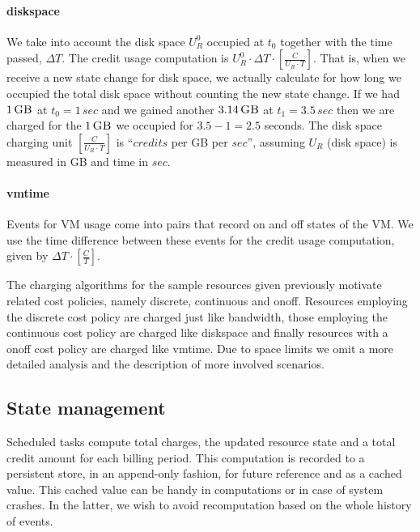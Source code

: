 \documentclass[letterpaper,twocolumn,10pt]{article}
\newcommand{\GB}[1]{\ensuremath{#1\,\mbox{\sc GB}}}
\newcommand{\secs}[1]{\ensuremath{#1\,sec}}
\begin{document}
\paragraph{\textsf{diskspace}}
We take into account the disk space $U_R^0$ occupied at $t_0$ together with the time passed, $\Delta T$. The credit usage computation is $U_R^{0} \cdot \Delta T \cdot [ \frac{C}{U_R \cdot T} ]$.
That is, when we receive a new state change for disk space, we actually calculate for how long we occupied the total disk space without counting the new state change. If we had \GB{1} at $t_0 = \secs{1}$ and we gained another \GB{3.14} at $t_1 = \secs{3.5}$ then we are charged for the \GB{1} we occupied for $3.5 - 1 = 2.5$ seconds. The disk space charging unit $[ \frac{C}{U_R \cdot T} ]$ is ``$credits$ per {\sc GB} per $sec$'', assuming $U_R$ (disk space) is measured in {\sc GB} and time in $sec$.


\paragraph{\textsf{vmtime}}
Events for VM usage come into pairs that record \textsf{on} and \textsf{off} states of the VM. We use the time difference between these events for the credit usage computation, given by $\Delta T \cdot [ \frac{C}{T} ]$.


The charging algorithms for the sample resources given previously motivate related cost policies, namely \textsf{discrete}, \textsf{continuous} and \textsf{onoff}. Resources employing the \textsf{discrete} cost policy are charged just like \textsf{bandwidth}, those employing the \textsf{continuous} cost policy are charged like \textsf{diskspace} and finally resources with a \textsf{onoff} cost policy are charged like \textsf{vmtime}. Due to space limits we omit a more detailed analysis and the description of more involved scenarios.


\subsection{State management}


Scheduled tasks compute total charges, the updated resource state and
a total credit amount for each billing period. This computation is
recorded to a persistent store, in an append-only fashion, for future
reference and as a cached value. This cached value can be handy in
computations or in case of system crashes. In the latter, we wish to
avoid recomputation based on the whole history of events.
\end{document}
